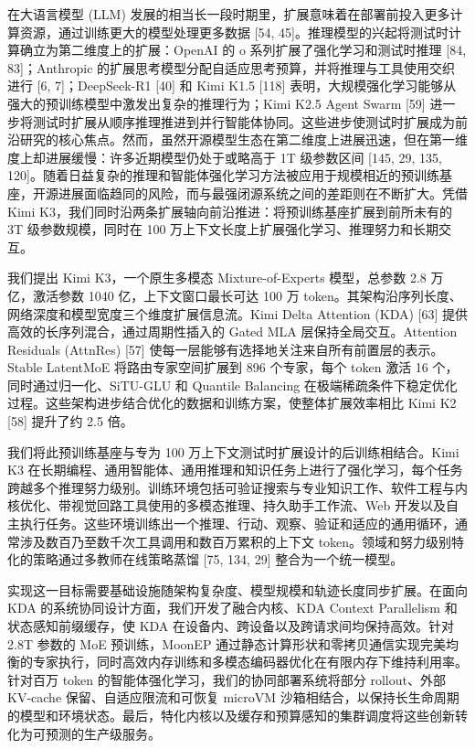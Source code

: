 在大语言模型 (LLM) 发展的相当长一段时期里，扩展意味着在部署前投入更多计算资源，通过训练更大的模型处理更多数据 [54, 45]。推理模型的兴起将测试时计算确立为第二维度上的扩展：OpenAI 的 o 系列扩展了强化学习和测试时推理 [84, 83]；Anthropic 的扩展思考模型分配自适应思考预算，并将推理与工具使用交织进行 [6, 7]；DeepSeek-R1 [40] 和 Kimi K1.5 [118] 表明，大规模强化学习能够从强大的预训练模型中激发出复杂的推理行为；Kimi K2.5 Agent Swarm [59] 进一步将测试时扩展从顺序推理推进到并行智能体协同。这些进步使测试时扩展成为前沿研究的核心焦点。然而，虽然开源模型生态在第二维度上进展迅速，但在第一维度上却进展缓慢：许多近期模型仍处于或略高于 1T 级参数区间 [145, 29, 135, 120]。随着日益复杂的推理和智能体强化学习方法被应用于规模相近的预训练基座，开源进展面临趋同的风险，而与最强闭源系统之间的差距则在不断扩大。凭借 Kimi K3，我们同时沿两条扩展轴向前沿推进：将预训练基座扩展到前所未有的 3T 级参数规模，同时在 100 万上下文长度上扩展强化学习、推理努力和长期交互。

我们提出 Kimi K3，一个原生多模态 Mixture-of-Experts 模型，总参数 2.8 万亿，激活参数 1040 亿，上下文窗口最长可达 100 万 token。其架构沿序列长度、网络深度和模型宽度三个维度扩展信息流。Kimi Delta Attention (KDA) [63] 提供高效的长序列混合，通过周期性插入的 Gated MLA 层保持全局交互。Attention Residuals (AttnRes) [57] 使每一层能够有选择地关注来自所有前置层的表示。Stable LatentMoE 将路由专家空间扩展到 896 个专家，每个 token 激活 16 个，同时通过归一化、SiTU-GLU 和 Quantile Balancing 在极端稀疏条件下稳定优化过程。这些架构进步结合优化的数据和训练方案，使整体扩展效率相比 Kimi K2 [58] 提升了约 2.5 倍。

我们将此预训练基座与专为 100 万上下文测试时扩展设计的后训练相结合。Kimi K3 在长期编程、通用智能体、通用推理和知识任务上进行了强化学习，每个任务跨越多个推理努力级别。训练环境包括可验证搜索与专业知识工作、软件工程与内核优化、带视觉回路工具使用的多模态推理、持久助手工作流、Web 开发以及自主执行任务。这些环境训练出一个推理、行动、观察、验证和适应的通用循环，通常涉及数百乃至数千次工具调用和数百万累积的上下文 token。领域和努力级别特化的策略通过多教师在线策略蒸馏 [75, 134, 29] 整合为一个统一模型。

实现这一目标需要基础设施随架构复杂度、模型规模和轨迹长度同步扩展。在面向 KDA 的系统协同设计方面，我们开发了融合内核、KDA Context Parallelism 和状态感知前缀缓存，使 KDA 在设备内、跨设备以及跨请求间均保持高效。针对 2.8T 参数的 MoE 预训练，MoonEP 通过静态计算形状和零拷贝通信实现完美均衡的专家执行，同时高效内存训练和多模态编码器优化在有限内存下维持利用率。针对百万 token 的智能体强化学习，我们的协同部署系统将部分 rollout、外部 KV-cache 保留、自适应限流和可恢复 microVM 沙箱相结合，以保持长生命周期的模型和环境状态。最后，特化内核以及缓存和预算感知的集群调度将这些创新转化为可预测的生产级服务。

